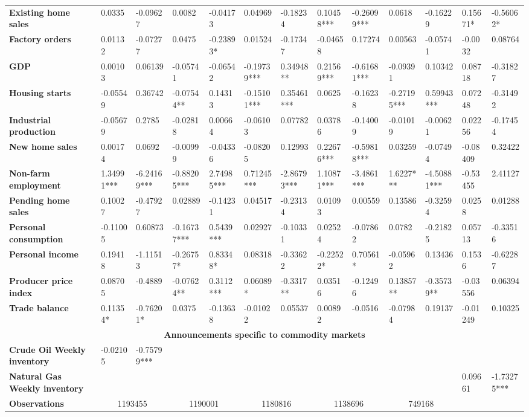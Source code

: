 \begin{sidewaystable}
{\begin{tabular}{@{}lllllllllllll@{}}
\textbf{Existing home sales}& 0.0335 & -0.09627 & 0.0082 & -0.04173 & 0.04969 & -0.18234 & 0.10458*** & -0.26099*** & 0.0618 & -0.16229 & 0.15671* & -0.56062* \\ \textbf{Factory orders}& 0.01132 & -0.07277 & 0.0475 & -0.23893* & 0.01524 & -0.17347 & -0.04658 & 0.17274 & 0.00563 & -0.05741 & -0.0032 & 0.08764 \\ \textbf{GDP}& 0.00103 & 0.06139 & -0.05741 & -0.06542 & -0.19739*** & 0.34948** & 0.21569*** & -0.61681*** & -0.09391 & 0.10342 & 0.08718 & -0.31827 \\ \textbf{Housing starts}& -0.05549 & 0.36742 & -0.07544** & 0.14313 & -0.15101*** & 0.35461*** & 0.0625 & -0.16238 & -0.27195*** & 0.59943*** & 0.07248 & -0.31492 \\ \textbf{Industrial production}& -0.05679 & 0.2785 & -0.02818 & 0.00664 & -0.06103 & 0.07782 & 0.03786 & -0.14009 & -0.01019 & -0.00621 & 0.02256 & -0.17454 \\ \textbf{New home sales}& 0.00174 & 0.0692 & -0.00999 & -0.04336 & -0.08205 & 0.12993 & 0.22676*** & -0.59818*** & 0.03259 & -0.07494 & -0.08409 & 0.32422 \\ \textbf{Non-farm employment}& 1.34991*** & -6.24169*** & -0.88205*** & 2.74985*** & 0.71245*** & -2.86793*** & 1.10871*** & -3.4861*** & 1.6227*** & -4.50881*** & -0.53455 & 2.41127 \\ \textbf{Pending home sales}& 0.10027 & -0.47927 & 0.02889 & -0.14231 & 0.04517 & -0.23134 & 0.01093 & 0.00559 & 0.13586 & -0.32594 & 0.0258 & 0.01288 \\ \textbf{Personal consumption}& -0.11005 & 0.60873 & -0.16737*** & 0.5439*** & 0.02927 & -0.10331 & 0.02524 & -0.07862 & 0.0782 & -0.21825 & 0.05713 & -0.33516 \\ \textbf{Personal income}& 0.19418 & -1.11513 & -0.26757* & 0.83348* & 0.08318 & -0.33622 & -0.22522* & 0.70561* & -0.05962 & 0.13436 & 0.1536 & -0.62287 \\ \textbf{Producer price index}& 0.08705 & -0.4889 & -0.07624** & 0.3112*** & 0.06089* & -0.3317** & 0.03516 & -0.12496 & 0.13857** & -0.35739** & -0.03556 & 0.06394 \\ \textbf{Trade balance}& 0.11354* & -0.76201* & 0.0375 & -0.13638 & -0.01022 & 0.05537 & 0.00892 & -0.0516 & -0.07984 & 0.19137 & -0.01249 & 0.10325 \\  \midrule \multicolumn{13}{c}{\textbf{Announcements specific to commodity markets}} \\ \midrule \textbf{Crude Oil Weekly inventory}& -0.02105 & -0.75799*** &  &  &  &  &  &  &  &  &  &  \\ \textbf{Natural Gas Weekly inventory}&  &  &  &  &  &  &  &  &  &  & 0.09661 & -1.73275*** \\  \midrule \textbf{Observations}             &\multicolumn{2}{c}{ 1193455 }                                                 & \multicolumn{2}{c}{ 1190001 }                                                 & \multicolumn{2}{c}{ 1180816 }                                                 & \multicolumn{2}{c}{ 1138696 }                                                 & \multicolumn{2}{c}{ 749168 }                                              
\end{tabular}}
\end{sidewaystable}
